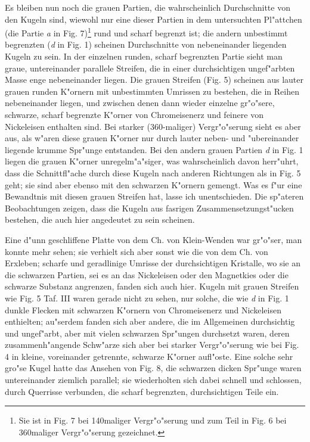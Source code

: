 \documentclass[a4paper, 11pt, oneside, german]{article}
\begin{document}
Es bleiben nun noch die grauen Partien, die wahrscheinlich Durchschnitte von den Kugeln sind, wiewohl nur eine dieser Partien in dem untersuchten Pl"attchen (die Partie \emph{a} in Fig. 7)\footnote{Sie ist in Fig. 7 bei 140maliger Vergr"o"serung und zum Teil in Fig. 6 bei 360maliger Vergr"o"serung gezeichnet.} rund und scharf begrenzt ist; die andern unbestimmt begrenzten (\emph{d} in Fig. 1) scheinen Durchschnitte von nebeneinander liegenden Kugeln zu sein. In der einzelnen runden, scharf begrenzten Partie sieht man graue, untereinander parallele Streifen, die in einer durchsichtigen ungef"arbten Masse enge nebeneinander liegen. Die grauen Streifen (Fig. 5) scheinen aus lauter grauen runden K"ornern mit unbestimmten Umrissen zu bestehen, die in Reihen nebeneinander liegen, und zwischen denen dann wieder einzelne gr"o"sere, schwarze, scharf begrenzte K"orner von Chromeisenerz und feinere von Nickeleisen enthalten sind. Bei starker (360-maliger) Vergr"o"serung sieht es aber aus, als w"aren diese grauen K"orner nur durch lauter neben- und "ubereinander liegende krumme Spr"unge entstanden. Bei den andern grauen Partien \emph{d} in Fig. 1 liegen die grauen K"orner unregelm"a"siger, was wahrscheinlich davon herr"uhrt, dass die Schnittfl"ache durch diese Kugeln nach anderen Richtungen als in Fig. 5 geht; sie sind aber ebenso mit den schwarzen K"ornern gemengt. Was es f"ur eine Bewandtnis mit diesen grauen Streifen hat, lasse ich unentschieden. Die sp"ateren Beobachtungen zeigen, dass die Kugeln aus fasrigen Zusammensetzungst"ucken bestehen, die auch hier angedeutet zu sein scheinen.

Eine d"unn geschliffene Platte von dem Ch. von Klein-Wenden war gr"o"ser, man konnte mehr sehen; sie verhielt sich aber sonst wie die von dem Ch. von Erxleben; scharfe und geradlinige Umrisse der durchsichtigen Kristalle, wo sie an die schwarzen Partien, sei es an das Nickeleisen oder den Magnetkies oder die schwarze Substanz angrenzen, fanden sich auch hier. Kugeln mit grauen Streifen wie Fig. 5 Taf. III waren gerade nicht zu sehen, nur solche, die wie \emph{d} in Fig. 1 dunkle Flecken mit schwarzen K"ornern von Chromeisenerz und Nickeleisen enthielten; au"serdem fanden sich aber andere, die im Allgemeinen durchsichtig und ungef"arbt, aber mit vielen schwarzen Spr"ungen durchsetzt waren, deren zusammenh"angende Schw"arze sich aber bei starker Vergr"o"serung wie bei Fig. 4 in kleine, voreinander getrennte, schwarze K"orner aufl"oste. Eine solche sehr gro"se Kugel hatte das Ansehen von Fig. 8, die schwarzen dicken Spr"unge waren untereinander ziemlich parallel; sie wiederholten sich dabei schnell und schlossen, durch Querrisse verbunden, die scharf begrenzten, durchsichtigen Teile ein.
\end{document}
